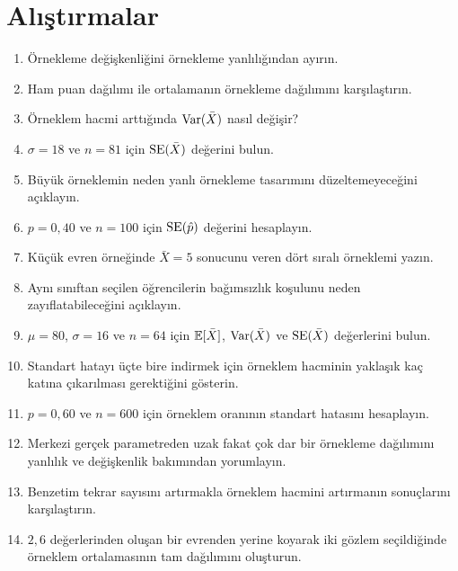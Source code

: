 
\section*{Alıştırmalar}

\begin{enumerate}
  \item Örnekleme değişkenliğini örnekleme yanlılığından ayırın.
  \item Ham puan dağılımı ile ortalamanın örnekleme dağılımını karşılaştırın.
  \item Örneklem hacmi arttığında $\operatorname{Var}(\bar X)$ nasıl değişir?
  \item $\sigma=18$ ve $n=81$ için $\operatorname{SE}(\bar X)$ değerini bulun.
  \item Büyük örneklemin neden yanlı örnekleme tasarımını düzeltemeyeceğini açıklayın.
  \item $p=0{,}40$ ve $n=100$ için $\operatorname{SE}(\hat p)$ değerini hesaplayın.
  \item Küçük evren örneğinde $\bar X=5$ sonucunu veren dört sıralı örneklemi yazın.
  \item Aynı sınıftan seçilen öğrencilerin bağımsızlık koşulunu neden zayıflatabileceğini açıklayın.
  \item $\mu=80$, $\sigma=16$ ve $n=64$ için $\mathbb{E}[\bar X]$,
  $\operatorname{Var}(\bar X)$ ve $\operatorname{SE}(\bar X)$ değerlerini bulun.
  \item Standart hatayı üçte bire indirmek için örneklem hacminin yaklaşık kaç
  katına çıkarılması gerektiğini gösterin.
  \item $p=0{,}60$ ve $n=600$ için örneklem oranının standart hatasını hesaplayın.
  \item Merkezi gerçek parametreden uzak fakat çok dar bir örnekleme dağılımını
  yanlılık ve değişkenlik bakımından yorumlayın.
  \item Benzetim tekrar sayısını artırmakla örneklem hacmini artırmanın
  sonuçlarını karşılaştırın.
  \item $2,6$ değerlerinden oluşan bir evrenden yerine koyarak iki gözlem
  seçildiğinde örneklem ortalamasının tam dağılımını oluşturun.
\end{enumerate}

